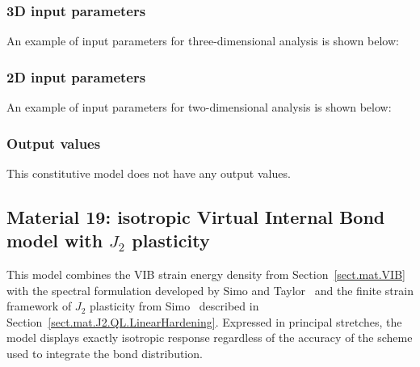 \subsubsection{3D input parameters}
An example of input parameters for three-dimensional analysis is shown 
below:

\subsubsection{2D input parameters}
An example of input parameters for two-dimensional analysis is shown 
below:

\subsubsection{Output values}
This constitutive model does not have any output values.

\subsection{Material 19: isotropic Virtual Internal Bond model
with $J_{2}$ plasticity}
\label{sect.mat.VIB.Simo.J2}
This model combines the VIB strain energy density from
Section~\ref{sect.mat.VIB} with the
spectral formulation developed by Simo and Taylor~\cite{Simo1991}
and the finite strain framework of $J_{2}$ plasticity
from Simo~\cite{Simo1992} described in 
Section~\ref{sect.mat.J2.QL.LinearHardening}.
Expressed in principal stretches, the model displays
exactly isotropic response regardless of the accuracy of the
scheme used to integrate the bond distribution.

